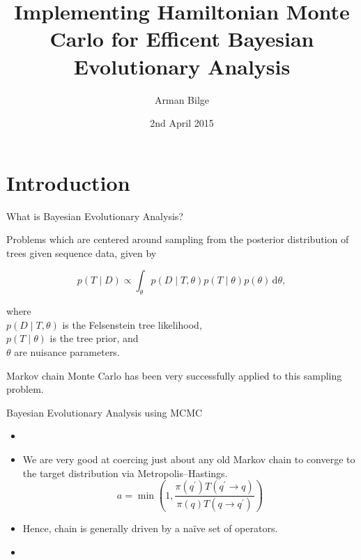 \documentclass{beamer}
\title[HMC]{Implementing Hamiltonian Monte Carlo for Efficent Bayesian Evolutionary Analysis}
\author{Arman Bilge}
\date{2nd April 2015}
\newcommand{\dd}{\, \text{d}}
\begin{document}
    \frame{\titlepage}

    \section{Introduction}

    \begin{frame}{What is Bayesian Evolutionary Analysis?}

        Problems which are centered around sampling from the posterior distribution of trees given sequence data, given by

        \begin{equation*}
            p\left(T \mid D\right)
                \propto \int_\theta p\left(D \mid T,\theta\right)
                p\left(T \mid \theta\right) p\left(\theta\right) \dd\theta,
        \end{equation*}

        where \\
        $p\left(D \mid T,\theta\right)$ is the Felsenstein tree likelihood, \\
        $p\left(T \mid \theta\right)$ is the tree prior, and \\
        $\theta$ are nuisance parameters.

        \vspace{14pt}
        Markov chain Monte Carlo has been very successfully applied to this sampling problem.

    \end{frame}

    \begin{frame}{Bayesian Evolutionary Analysis using MCMC}

        \begin{itemize}
            \item {} 
            \item<2-> We are very good at coercing just about any old Markov chain to converge to the target distribution via Metropolis--Hastings.
            \begin{equation*}
                a = \min\left(1, \frac{\pi\left(q^\prime\right)T\left(q^\prime\to q\right)}{\pi\left(q\right)T\left(q\to q^\prime\right)}\right)
            \end{equation*}
            \pause
            \item Hence, chain is generally driven by a na\"ive set of operators.
            \pause
            \item
        \end{itemize}

    \end{frame}
\end{document}

